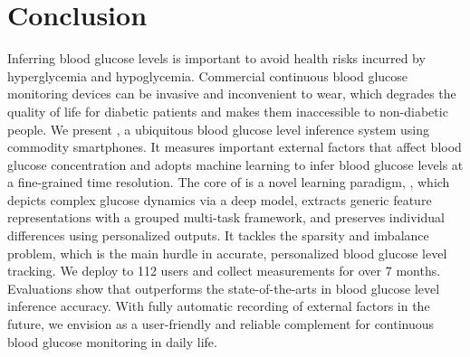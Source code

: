 
\section{Conclusion}
\label{sec:conclusion}
Inferring blood glucose levels is important to avoid health risks incurred by hyperglycemia and hypoglycemia.
Commercial continuous blood glucose monitoring devices can be invasive and inconvenient to wear, which degrades the quality of life for diabetic patients and makes them inaccessible to non-diabetic people.
We present \sysname, a ubiquitous blood glucose level inference system using commodity smartphones.
It measures important external factors that affect blood glucose concentration and adopts machine learning to infer blood glucose levels at a fine-grained time resolution.
The core of \sysname is a novel learning paradigm, \modelname, which depicts complex glucose dynamics via a deep model, extracts generic feature representations with a grouped multi-task framework, and preserves individual differences using personalized outputs.
It tackles the sparsity and imbalance problem, which is the main hurdle in accurate, personalized blood glucose level tracking.
We deploy \sysname to 112 users and collect measurements for over 7 months. 
Evaluations show that \sysname outperforms the state-of-the-arts in blood glucose level inference accuracy.
With fully automatic recording of external factors in the future, we envision \sysname as a user-friendly and reliable complement for continuous blood glucose monitoring in daily life. 

